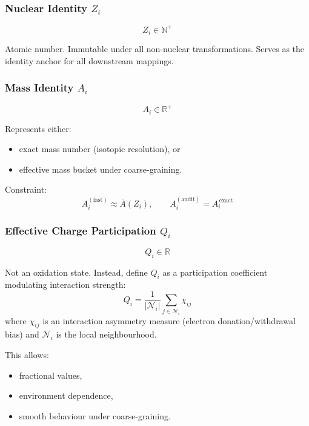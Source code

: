 \documentclass[11pt, a4paper, oneside]{article}
\theoremstyle{definition}
\theoremstyle{remark}
\newcommand{\R}{\mathbb{R}}
\newcommand{\N}{\mathbb{N}}
\begin{document}
\subsubsection{Nuclear Identity \texorpdfstring{$Z_i$}{Zi}}
\label{sec:nuclear-identity}

\[
  Z_i \in \N^{+}
\]

Atomic number.  Immutable under all non-nuclear transformations.
Serves as the identity anchor for all downstream mappings.

\subsubsection{Mass Identity \texorpdfstring{$A_i$}{Ai}}
\label{sec:mass-identity}

\[
  A_i \in \R^{+}
\]

Represents either:
\begin{itemize}
  \item exact mass number (isotopic resolution), or
  \item effective mass bucket under coarse-graining.
\end{itemize}

\noindent Constraint:
\[
  A_i^{(\text{fast})} \approx \bar{A}(Z_i),
  \qquad
  A_i^{(\text{audit})} = A_i^{\,\text{exact}}
\]

\subsubsection{Effective Charge Participation
              \texorpdfstring{$Q_i$}{Qi}}
\label{sec:charge-participation}

\[
  Q_i \in \R
\]

Not an oxidation state.  Instead, define $Q_i$ as a participation
coefficient modulating interaction strength:
%
\begin{equation}
  Q_i = \frac{1}{|\mathcal{N}_i|}
        \sum_{j \in \mathcal{N}_i} \chi_{ij}
  \label{eq:charge-participation}
\end{equation}
%
where $\chi_{ij}$ is an interaction asymmetry measure (electron
donation/withdrawal bias) and $\mathcal{N}_i$ is the local
neighbourhood.

This allows:
\begin{itemize}
  \item fractional values,
  \item environment dependence,
  \item smooth behaviour under coarse-graining.
\end{itemize}
\end{document}
